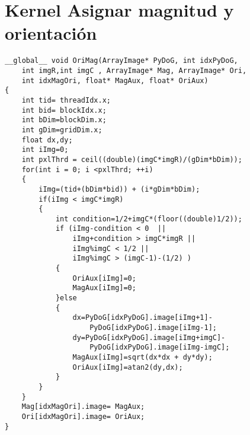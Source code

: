 \chapter{Kernel Asignar magnitud y orientación}

\begin{small}
\lstset{tabsize=2, frame=none}
\begin{lstlisting}
__global__ void OriMag(ArrayImage* PyDoG, int idxPyDoG,
	int imgR,int imgC , ArrayImage* Mag, ArrayImage* Ori,
	int idxMagOri, float* MagAux, float* OriAux) 
{
	int tid= threadIdx.x;
	int bid= blockIdx.x;
	int bDim=blockDim.x;
	int gDim=gridDim.x;
	float dx,dy;
	int iImg=0;
	int pxlThrd = ceil((double)(imgC*imgR)/(gDim*bDim)); 
	for(int i = 0; i <pxlThrd; ++i)
	{
		iImg=(tid+(bDim*bid)) + (i*gDim*bDim); 
		if(iImg < imgC*imgR)
		{
			int condition=1/2+imgC*(floor((double)1/2));
			if (iImg-condition < 0  ||										
				iImg+condition > imgC*imgR ||								
				iImg%imgC < 1/2 ||										
				iImg%imgC > (imgC-1)-(1/2) )							
			{                  
				OriAux[iImg]=0;
				MagAux[iImg]=0;
			}else
			{
				dx=PyDoG[idxPyDoG].image[iImg+1]-
					PyDoG[idxPyDoG].image[iImg-1];
				dy=PyDoG[idxPyDoG].image[iImg+imgC]-
					PyDoG[idxPyDoG].image[iImg-imgC];
				MagAux[iImg]=sqrt(dx*dx + dy*dy);
				OriAux[iImg]=atan2(dy,dx);
			}
		}
	}
	Mag[idxMagOri].image= MagAux;
	Ori[idxMagOri].image= OriAux;
}
\end{lstlisting}


\end{small}
\pagebreak

